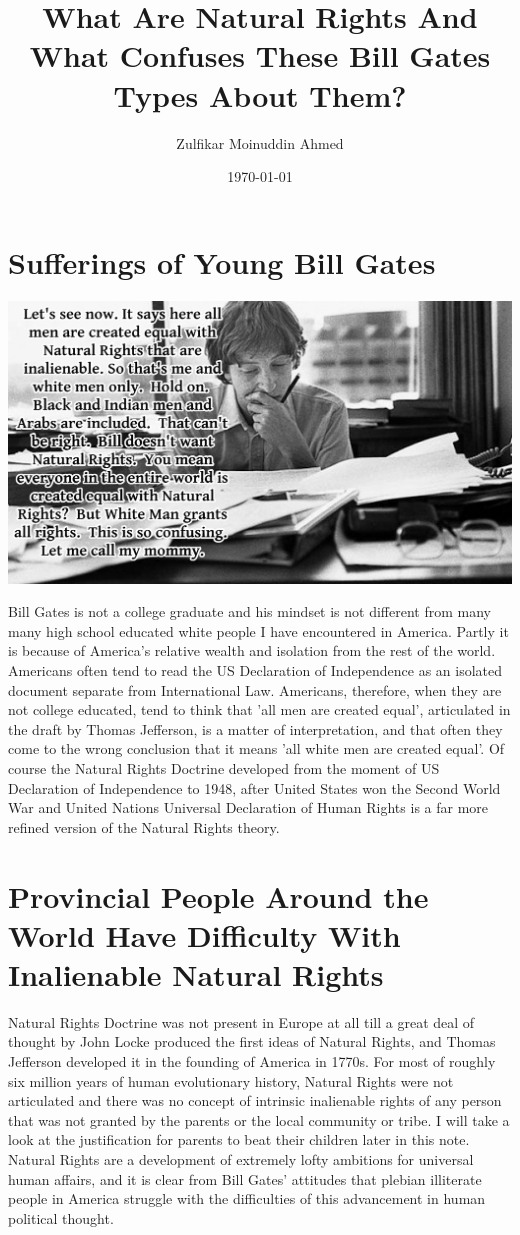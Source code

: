 \documentclass{amsart}
\title{What Are Natural Rights And What Confuses These Bill Gates Types About Them?}
\author{Zulfikar Moinuddin Ahmed}
\date{\today}
\begin{document}
\maketitle


\section{Sufferings of Young Bill Gates}

\includegraphics[scale=0.55]{natrights.jpg}

Bill Gates is not a college graduate and his mindset is not different from many many high school educated white people I have encountered in America.  Partly it is because of America's relative wealth and isolation from the rest of the world.  Americans often tend to read the US Declaration of Independence as an isolated document separate from International Law.  Americans, therefore, when they are not college educated, tend to think that 'all men are created equal', articulated in the draft by Thomas Jefferson, is a matter of interpretation, and that often they come to the wrong conclusion that it means 'all white men are created equal'.  Of course the Natural Rights Doctrine developed from the moment of US Declaration of Independence to 1948, after United States won the Second World War and United Nations Universal Declaration of Human Rights is a far more refined version of the Natural Rights theory.  

\section{Provincial People Around the World Have Difficulty With Inalienable Natural Rights}

Natural Rights Doctrine was not present in Europe at all till a great deal of thought by John Locke produced the first ideas of Natural Rights, and Thomas Jefferson developed it in the founding of America in 1770s.  For most of roughly six million years of human evolutionary history, Natural Rights were not articulated and there was no concept of intrinsic inalienable rights of any person that was not granted by the parents or the local community or tribe.  I will take a look at the justification for parents to beat their children later in this note.  Natural Rights are a development of extremely lofty ambitions for universal human affairs, and it is clear from Bill Gates' attitudes that plebian illiterate people in America struggle with the difficulties of this advancement in human political thought.
\end{document}
